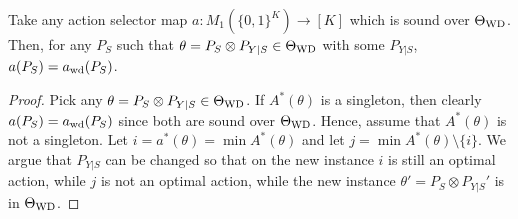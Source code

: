 \begin{thm}\label{prop:awdunique}
	Take any action selector map $a: M_1( \{0,1\}^K ) \to [K]$ which is sound over $\Theta_{\mathrm{WD}}$.
	Then, for any $P_S$ such that $\theta = P_S\otimes P_{Y|S}\in \Theta_{\mathrm{WD}}$ with some $P_{Y|S}$,
	$a(P_S) = a_{\mathrm{wd}}(P_S)$.
\end{thm}
\begin{proof}
	Pick any $\theta = P_S\otimes P_{Y|S}\in \Theta_{\mathrm{WD}}$. If $A^*(\theta)$ is a singleton, then clearly $a(P_S) = a_{\mathrm{wd}}(P_S)$ since both are sound over $\Theta_{\mathrm{WD}}$.
	Hence, assume that $A^*(\theta)$ is not a singleton.
	Let $i = a^*(\theta) = \min A^*(\theta)$ and let $j = \min A^*(\theta) \setminus \{ i \}$.
	We argue that $P_{Y|S}$ can be changed so that on the new instance $i$ is still an optimal action, while
	$j$ is not an optimal action, while the new instance $\theta' = P_S \otimes P_{Y|S}'$ is in $\Theta_{\mathrm{WD}}$.
	

\end{proof}
